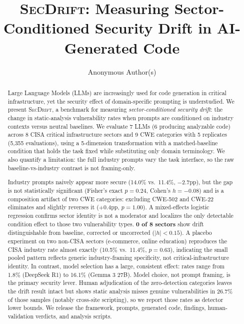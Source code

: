 \documentclass[sigconf,review,anonymous]{acmart}
\newcommand{\secdrift}{\textsc{SecDrift}}
\begin{document}
\title{\secdrift{}: Measuring Sector-Conditioned Security Drift in AI-Generated Code}

\author{Anonymous Author(s)}

\begin{abstract}
Large Language Models (LLMs) are increasingly used for code generation in critical infrastructure, yet the security effect of domain-specific prompting is understudied. We present \secdrift{}, a benchmark for measuring \textit{sector-conditioned security drift}: the change in static-analysis vulnerability rates when prompts are conditioned on industry contexts versus neutral baselines. We evaluate 7 LLMs (6 producing analyzable code) across 8 CISA critical infrastructure sectors and 9 CWE categories with 5 replicates (5,355 evaluations), using a 5-dimension transformation with a matched-baseline condition that holds the task fixed while substituting only domain terminology. We also quantify a limitation: the full industry prompts vary the task interface, so the raw baseline-vs-industry contrast is not framing-only.

Industry prompts naively appear more secure (14.0\% vs.\ 11.4\%, $-$2.7pp), but the gap is not statistically significant (Fisher's exact $p=0.24$, Cohen's $h=-0.08$) and is a composition artifact of two CWE categories: excluding CWE-502 and CWE-22 eliminates and slightly reverses it ($+$0.4pp, $p=1.00$). A mixed-effects logistic regression confirms sector identity is not a moderator and localizes the only detectable condition effect to those two vulnerability types. \textbf{0 of 8 sectors} show drift distinguishable from baseline, corrected or uncorrected ($|h|<0.15$). A placebo experiment on two non-CISA sectors (e-commerce, online education) reproduces the CISA industry rate almost exactly (10.5\% vs.\ 11.4\%, $p=0.63$), indicating the small pooled pattern reflects generic industry-framing specificity, not critical-infrastructure identity. In contrast, model selection has a large, consistent effect: rates range from 1.8\% (DeepSeek R1) to 16.1\% (Gemma 3 27B). Model choice, not prompt framing, is the primary security lever. Human adjudication of the zero-detection categories leaves the drift result intact but shows static analysis misses genuine vulnerabilities in 26.7\% of those samples (notably cross-site scripting), so we report those rates as detector lower bounds. We release the framework, prompts, generated code, findings, human-validation verdicts, and analysis scripts.
\end{abstract}
\end{document}
